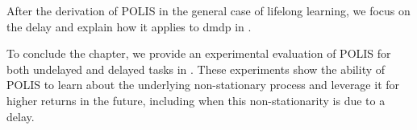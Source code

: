 After the derivation of POLIS in the general case of lifelong learning, we focus on the delay and explain how it applies to \gls{dmdp} in .

To conclude the chapter, we provide an experimental evaluation of POLIS for both undelayed and delayed tasks in .
These experiments show the ability of POLIS to learn about the underlying non-stationary process and leverage it for higher returns in the future, including when this non-stationarity is due to a delay.





